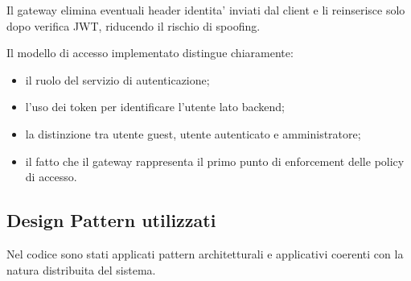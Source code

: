 Il gateway elimina eventuali header identita' inviati dal client e li reinserisce solo dopo verifica JWT, riducendo il rischio di spoofing.

Il modello di accesso implementato distingue chiaramente:

\begin{itemize}
	\item il ruolo del servizio di autenticazione;
	\item l'uso dei token per identificare l'utente lato backend;
	\item la distinzione tra utente guest, utente autenticato e amministratore;
	\item il fatto che il gateway rappresenta il primo punto di enforcement delle policy di accesso.
\end{itemize}

\subsection{Design Pattern utilizzati}
Nel codice sono stati applicati pattern architetturali e applicativi coerenti con la natura distribuita del sistema.

